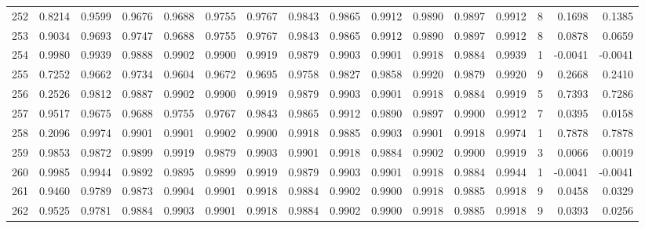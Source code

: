\begin{tabular}{lrrrrrrrrrrrrrrr}
252 &      0.8214 &  0.9599 &  0.9676 &  0.9688 &  0.9755 &  0.9767 &  0.9843 &  0.9865 &  0.9912 &  0.9890 &   0.9897 &     0.9912 &      8 &                    0.1698 &                     0.1385 \\
253 &      0.9034 &  0.9693 &  0.9747 &  0.9688 &  0.9755 &  0.9767 &  0.9843 &  0.9865 &  0.9912 &  0.9890 &   0.9897 &     0.9912 &      8 &                    0.0878 &                     0.0659 \\
254 &      0.9980 &  0.9939 &  0.9888 &  0.9902 &  0.9900 &  0.9919 &  0.9879 &  0.9903 &  0.9901 &  0.9918 &   0.9884 &     0.9939 &      1 &                   -0.0041 &                    -0.0041 \\
255 &      0.7252 &  0.9662 &  0.9734 &  0.9604 &  0.9672 &  0.9695 &  0.9758 &  0.9827 &  0.9858 &  0.9920 &   0.9879 &     0.9920 &      9 &                    0.2668 &                     0.2410 \\
256 &      0.2526 &  0.9812 &  0.9887 &  0.9902 &  0.9900 &  0.9919 &  0.9879 &  0.9903 &  0.9901 &  0.9918 &   0.9884 &     0.9919 &      5 &                    0.7393 &                     0.7286 \\
257 &      0.9517 &  0.9675 &  0.9688 &  0.9755 &  0.9767 &  0.9843 &  0.9865 &  0.9912 &  0.9890 &  0.9897 &   0.9900 &     0.9912 &      7 &                    0.0395 &                     0.0158 \\
258 &      0.2096 &  0.9974 &  0.9901 &  0.9901 &  0.9902 &  0.9900 &  0.9918 &  0.9885 &  0.9903 &  0.9901 &   0.9918 &     0.9974 &      1 &                    0.7878 &                     0.7878 \\
259 &      0.9853 &  0.9872 &  0.9899 &  0.9919 &  0.9879 &  0.9903 &  0.9901 &  0.9918 &  0.9884 &  0.9902 &   0.9900 &     0.9919 &      3 &                    0.0066 &                     0.0019 \\
260 &      0.9985 &  0.9944 &  0.9892 &  0.9895 &  0.9899 &  0.9919 &  0.9879 &  0.9903 &  0.9901 &  0.9918 &   0.9884 &     0.9944 &      1 &                   -0.0041 &                    -0.0041 \\
261 &      0.9460 &  0.9789 &  0.9873 &  0.9904 &  0.9901 &  0.9918 &  0.9884 &  0.9902 &  0.9900 &  0.9918 &   0.9885 &     0.9918 &      9 &                    0.0458 &                     0.0329 \\
262 &      0.9525 &  0.9781 &  0.9884 &  0.9903 &  0.9901 &  0.9918 &  0.9884 &  0.9902 &  0.9900 &  0.9918 &   0.9885 &     0.9918 &      9 &                    0.0393 &                     0.0256 \\

\end{tabular}
